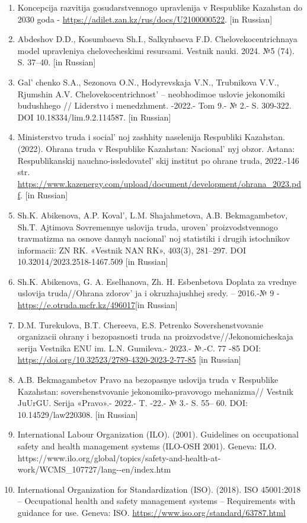 \begin{references}
\begin{enumerate}
\def\labelenumi{\arabic{enumi}.}
\item
  Koncepcija razvitija gosudarstvennogo upravlenija v Respublike
  Kazahstan do 2030 goda -
  \url{https://adilet.zan.kz/rus/docs/U2100000522}. {[}in Russian{]}
\item
  Abdeshov D.D., Kosumbaeva Sh.I., Salkynbaeva F.D.
  Chelovekocentrichnaya model upravleniya chelovecheskimi resursami.
  Vestnik nauki. 2024. №5 (74). S. 37--40. {[}in Russian{]}
\item
  Gal' chenko S.A., Sezonova O.N., Hodyrevskaja V.N.,
  Trubnikova V.V., Rjumshin A.V. Chelovekocentrichnost'{}
  -- neobhodimoe uslovie jekonomiki budushhego // Liderstvo i
  menedzhment. -2022.- Tom 9.- № 2.- S. 309-322. DOI
  10.18334/lim.9.2.114587. {[}in Russian{]}
\item
  Ministerstvo truda i social' noj zashhity naselenija
  Respubliki Kazahstan. (2022). Ohrana truda v Respublike Kazahstan:
  Nacional' nyj obzor. Astana: Respublikanskij
  nauchno-issledovatel' skij institut po ohrane truda,
  2022.-146 str.
  \url{https://www.kazenergy.com/upload/document/development/ohrana_2023.pdf}.
  {[}in Russian{]}
\item
  Sh.K. Abikenova, A.P. Koval', L.M. Shajahmetova, A.B.
  Bekmagambetov, Sh.T. Ajtimova Sovremennye uslovija truda,
  uroven'{} proizvodstvennogo travmatizma na osnove
  dannyh nacional' noj statistiki i drugih istochnikov
  informacii: ZN RK. «Vestnik NAN RK», 403(3), 281--297. DOI
  10.32014/2023.2518-1467.509 {[}in Russian{]}
\item
  Sh.K. Abikenova, G. A. Eselhanova, Zh. H. Esbenbetova Doplata za
  vrednye uslovija truda//Ohrana zdorov' ja i
  okruzhajushhej sredy. -- 2016.-№ 9 -
  \url{https://e.otruda.mcfr.kz/496017}{[}in Russian{]}
\item
  D.M. Turekulova, B.T. Chereeva, E.S. Petrenko Sovershenstvovanie
  organizacii ohrany i bezopasnosti truda na
  proizvodstve//Jekonomicheskaja serija Vestnika ENU im. L.N. Gumileva.-
  2023.- №.-C. 77 -85 DOI:
  \url{https://doi.org/10.32523/2789-4320-2023-2-77-85} {[}in Russian{]}
\item
  A.B. Bekmagambetov Pravo na bezopasnye uslovija truda v Respublike
  Kazahstan: sovershenstvovanie jekonomiko-pravovogo mehanizma// Vestnik
  JuUrGU. Serija «Pravo».- 2022.- T. -22.- № 3.- S. 55-- 60. DOI:
  10.14529/law220308. {[}in Russian{]}
\item
  International Labour Organization (ILO). (2001). Guidelines on
  occupational safety and health management systems (ILO-OSH 2001).
  Geneva: ILO.
  https://www.ilo.org/global/topics/safety-and-health-at-work/WCMS\_107727/lang-\/-en/index.htm
\item
  International Organization for Standardization (ISO). (2018). ISO
  45001:2018 -- Occupational health and safety management systems --
  Requirements with guidance for use. Geneva: ISO.
  \url{https://www.iso.org/standard/63787.html}
\end{enumerate}


\end{references}
